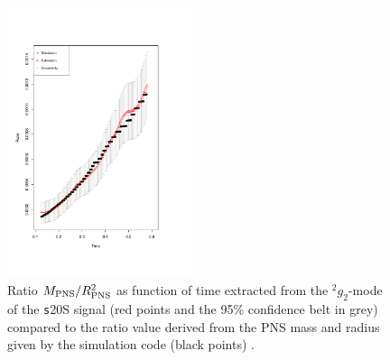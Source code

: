 \begin{figure}
 \centering
 \includegraphics[width=0.5\textwidth,height=0.3\textheight]{plots/ratio}
 \caption{Ratio $M_{\rm PNS}/R_{\rm PNS}^2$ as function of time extracted from the $\mbox{}^2 g_2$-mode of the {\texttt s20S} signal (red points and the 95\% confidence belt in grey) compared to the ratio value derived from the PNS mass and radius given by the simulation code (black points) .} \label{fig:ratio}
\end{figure}


